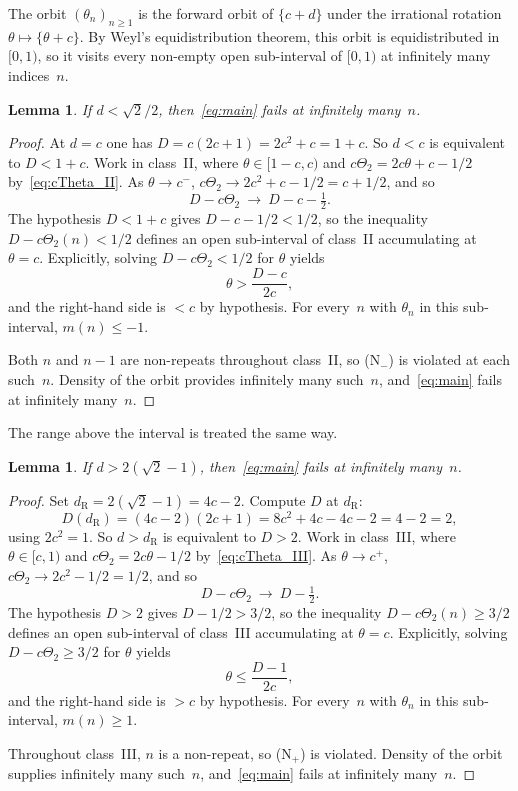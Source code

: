 \documentclass{birkjour}
\newtheorem{lemma}[theorem]{Lemma}
\theoremstyle{definition}
\theoremstyle{remark}
\newcommand{\frc}[1]{\{ #1 \}}
\begin{document}
The orbit $(\theta_{n})_{n\ge 1}$ is the forward
orbit of $\{c+d\}$ under the irrational rotation
$\theta\mapsto\frc{\theta+c}$. By Weyl's
equidistribution theorem, this orbit is
equidistributed in $[0,1)$, so it visits every
non-empty open sub-interval of $[0,1)$ at infinitely
many indices~$n$.

\begin{lemma}\label{lem:lower}
If $d<\sqrt{2}/2$, then~\eqref{eq:main}
fails at infinitely many~$n$.
\end{lemma}

\begin{proof}
At $d=c$ one has $D=c(2c+1)=2c^{2}+c=1+c$.
So $d<c$ is equivalent to $D<1+c$.
Work in class~II, where $\theta\in[1{-}c,c)$ and
$c\Theta_{2}=2c\theta+c-1/2$ by~\eqref{eq:cTheta_II}.
As $\theta\to c^{-}$,
$c\Theta_{2}\to 2c^{2}+c-1/2=c+1/2$, and so
\[
  D-c\Theta_{2}\ \longrightarrow\ D-c-\tfrac{1}{2}.
\]
The hypothesis $D<1+c$ gives $D-c-1/2<1/2$, so
the inequality $D-c\Theta_{2}(n)<1/2$ defines an
open sub-interval of class~II accumulating at
$\theta=c$. Explicitly, solving $D-c\Theta_{2}<1/2$
for $\theta$ yields
\begin{equation*}  \theta>\frac{D-c}{2c},
\end{equation*}
and the right-hand side is $<c$ by hypothesis.
For every~$n$ with $\theta_{n}$ in this
sub-interval, $m(n)\le -1$.

Both $n$ and $n-1$ are non-repeats throughout
class~II, so (N$_{-}$) is violated at each such~$n$.
Density of the orbit provides infinitely many such~$n$,
and~\eqref{eq:main} fails at infinitely many~$n$.
\end{proof}

The range above the interval is treated the same way.

\begin{lemma}\label{lem:upper}
If $d>2(\sqrt{2}-1)$, then~\eqref{eq:main}
fails at infinitely many~$n$.
\end{lemma}

\begin{proof}
Set $d_{\mathrm{R}}=2(\sqrt{2}-1)=4c-2$. Compute $D$ at $d_{\mathrm{R}}$:
\[
  D(d_{\mathrm{R}})=(4c-2)(2c+1)=8c^{2}+4c-4c-2=4-2=2,
\]
using $2c^{2}=1$. So $d>d_{\mathrm{R}}$ is equivalent to $D>2$.
Work in class~III, where $\theta\in[c,1)$ and
$c\Theta_{2}=2c\theta-1/2$ by~\eqref{eq:cTheta_III}.
As $\theta\to c^{+}$,
$c\Theta_{2}\to 2c^{2}-1/2=1/2$, and so
\[
  D-c\Theta_{2}\ \longrightarrow\ D-\tfrac{1}{2}.
\]
The hypothesis $D>2$ gives $D-1/2>3/2$, so the
inequality $D-c\Theta_{2}(n)\ge 3/2$ defines an
open sub-interval of class~III accumulating at
$\theta=c$. Explicitly, solving $D-c\Theta_{2}\ge 3/2$
for $\theta$ yields
\begin{equation*}  \theta\le\frac{D-1}{2c},
\end{equation*}
and the right-hand side is $>c$ by hypothesis.
For every~$n$ with $\theta_{n}$ in this
sub-interval, $m(n)\ge 1$.

Throughout class~III, $n$ is a non-repeat, so (N$_{+}$)
is violated. Density of the orbit supplies infinitely
many such~$n$, and~\eqref{eq:main} fails at infinitely
many~$n$.
\end{proof}
\end{document}
